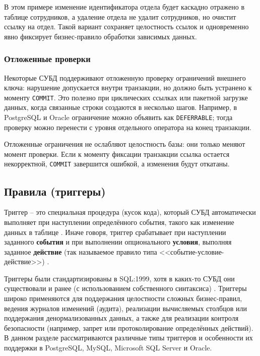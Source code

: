 В этом примере изменение идентификатора отдела будет каскадно отражено в таблице сотрудников, а удаление отдела не удалит сотрудников, но очистит ссылку на отдел. Такой вариант сохраняет целостность ссылок и одновременно явно фиксирует бизнес-правило обработки зависимых данных.

\subsubsection{Отложенные проверки}

Некоторые СУБД поддерживают отложенную проверку ограничений внешнего ключа: нарушение допускается внутри транзакции, но должно быть устранено к моменту \texttt{COMMIT}. Это полезно при циклических ссылках или пакетной загрузке данных, когда связанные строки создаются в несколько шагов. Например, в PostgreSQL и Oracle ограничение можно объявить как \texttt{DEFERRABLE}; тогда проверку можно перенести с уровня отдельного оператора на конец транзакции.

Отложенные ограничения не ослабляют целостность базы: они только меняют момент проверки. Если к моменту фиксации транзакции ссылка остается некорректной, \texttt{COMMIT} завершится ошибкой, а изменения будут откатаны.

\subsection{Правила (триггеры)}

 Триггер – это специальная процедура (кусок кода), который СУБД автоматически выполняет при наступлении определённого события, такого как изменение данных в таблице \autocite{Silberschatz}. Иначе говоря, триггер срабатывает при наступлении заданного \textbf{события} и при выполнении опционального \textbf{условия}, выполняя заданное \textbf{действие} (так называемое правило типа <<событие-условие-действие>>) \autocite{ElmasriNavathe}. 
 
 Триггеры были стандартизированы в SQL:1999, хотя в каких-то СУБД они существовали и ранее (с использованием собственного синтаксиса) \autocite{Silberschatz}. Триггеры широко применяются для поддержания целостности сложных бизнес-правил, ведения журналов изменений (аудита), реализации вычисляемых столбцов или поддержания денормализованных данных, а также для реализации контроля безопасности (например, запрет или протоколирование определённых действий). В данном разделе рассматриваются различные типы триггеров и особенности их поддержки в PostgreSQL, MySQL, Microsoft SQL Server и Oracle.

